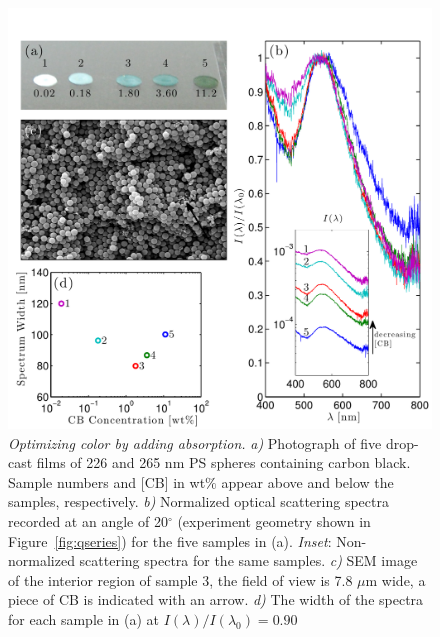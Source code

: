 \begin{figure}[htbp]
\centering
\includegraphics[width=.9\textwidth]{figures/carbonblack_100128.pdf}
\caption{\label{fig:carbonblack} \emph{Optimizing color by adding absorption.} 			\emph{a)} Photograph of five drop-cast films of 226 and 265 nm PS spheres containing carbon black.  Sample numbers and [CB] in wt$\%$ appear above and below the samples, respectively. 
	\emph{b)} Normalized optical scattering spectra recorded at an angle of 20$^{\circ}$ (experiment geometry shown in Figure~\ref{fig:qseries}) for the five samples in (a). \emph{Inset}: Non-normalized scattering spectra for the same samples. 
	\emph{c)} SEM image of the interior region of sample 3, the field of view is 7.8 $\mu$m wide, a piece of CB is indicated with an arrow. 
	\emph{d)} The width of the spectra for each sample in (a) at $I(\lambda)/I(\lambda_0) = 0.90$}  
\end{figure}

